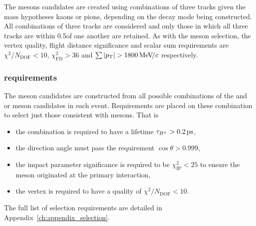 The \Dsp mesons candidates are created using combinations of three tracks given the mass hypotheses kaons or pions, depending on the decay mode being constructed. All combinations of three tracks are considered and only those in which all three tracks are within 0.5\mm of one another are retained. As with the \Dzb meson selection, the vertex quality, flight distance significance and scalar \pt sum requirements are $\chi^{2}/N_{\text{DOF}} < 10$, $\chi^{2}_{\text{FD} }  > 36$ and $\sum{|\pt|} > 1800 \mevc$ respectively.




\subsubsection{\Bp requirements}
The \Bp meson candidates are constructed from all possible combinations of the \Dsp and \phiz or \Dzb meson candidates in each event.
Requirements are placed on these combination to select just those consistent with \Bp mesons.
That is
\begin{itemize}
\item the combination is required to have a lifetime $\tau_{{{{B}^+}}} > 0.2{\mathrm{ \,ps}}$, 
\item the direction angle must pass the requirement $\cos{\theta}>0.999$,
\item the impact parameter significance is required to be $\chi^{2}_{\text{IP}} < 25$ to ensure the \Bp meson originated at the primary interaction, 
\item the vertex is required to have a quality of $\chi^{2}/N_{\text{DOF}} < 10$. 
\end{itemize}
The full list of selection requirements are detailed in Appendix~\ref{ch:appendix_selection}. 


